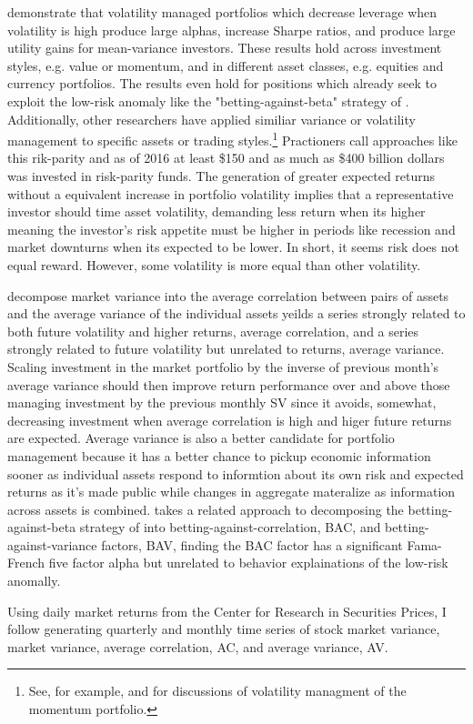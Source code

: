 \cite{moreira_volatility-managed_2017} demonstrate that volatility managed portfolios which decrease leverage when volatility is high produce large alphas, increase Sharpe ratios, and produce large utility gains for mean-variance investors. These results hold across investment styles, e.g. value or momentum, and in different asset classes, e.g. equities and currency portfolios. The results even hold for positions which already seek to exploit the low-risk anomaly like the "betting-against-beta" strategy of \cite{frazzini_betting_2014}. Additionally, other researchers have applied similiar variance or volatility management to specific assets or trading styles.\footnote{See, for example, \cite{barroso_momentum_2015} and \cite{kim_time_2016} for discussions of volatility managment of the momentum portfolio.} Practioners call approaches like this rik-parity and as of 2016 at least \$150 and as much as \$400 billion dollars was invested in risk-parity funds.\cite{steward_truly_2010,cao_risk_2016} The generation of greater expected returns without a equivalent increase in portfolio volatility implies that a representative investor should time asset volatility, demanding less return when its higher meaning the investor's risk appetite must be higher in periods like recession and market downturns when its expected to be lower. In short, it seems risk does not equal reward. However, some volatility is more equal than other volatility.

\cite{pollet_average_2010} decompose market variance into the average correlation between pairs of assets and the average variance of the individual assets yeilds a series strongly related to both future volatility and higher returns, average correlation, and a series strongly related to future volatility but unrelated to returns, average variance. Scaling investment in the market portfolio by the inverse of previous month’s average variance should then improve return performance over and above those managing investment by the previous monthly SV since it avoids, somewhat, decreasing investment when average correlation is high and higer future returns are expected. Average variance is also a better candidate for portfolio management because it has a better chance to pickup economic information sooner as individual assets respond to informtion about its own risk and expected returns as it's made public while changes in aggregate materalize as information across assets is combined. \cite{asness_betting_2018} takes a related approach to decomposing the betting-against-beta strategy of \cite{frazzini_betting_2014} into betting-against-correlation, BAC, and betting-against-variance factors, BAV, finding the BAC factor has a significant Fama-French five factor alpha but unrelated to behavior explainations of the low-risk anomally.\cite{fama_dissecting_2016}

Using daily market returns from the Center for Research in Securities Prices, I follow \cite{pollet_average_2010} generating quarterly and monthly time series of stock market variance, market variance, average correlation, AC, and average variance, AV.